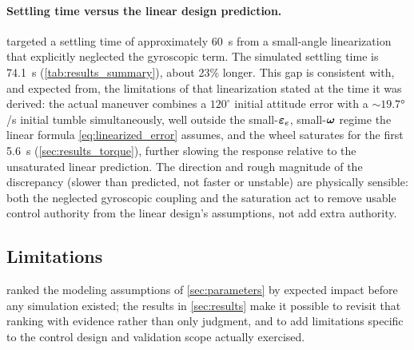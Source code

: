 \paragraph{Settling time versus the linear design prediction.}  targeted a settling time of approximately \SI{60}{\second} from a small-angle linearization that explicitly neglected the gyroscopic term. The simulated settling time is \SI{74.1}{\second} (\cref{tab:results_summary}), about 23\% longer. This gap is consistent with, and expected from, the limitations of that linearization stated at the time it was derived: the actual maneuver combines a $120^\circ$ initial attitude error with a $\sim\!\ang{19.7}$/s initial tumble simultaneously, well outside the small-$\bm{\varepsilon}_e$, small-$\bm{\omega}$ regime the linear formula \cref{eq:linearized_error} assumes, and the wheel saturates for the first \SI{5.6}{\second} (\cref{sec:results_torque}), further slowing the response relative to the unsaturated linear prediction. The direction and rough magnitude of the discrepancy (slower than predicted, not faster or unstable) are physically sensible: both the neglected gyroscopic coupling and the saturation act to remove usable control authority from the linear design's assumptions, not add extra authority.

\subsection{Limitations}
\label{sec:limitations}

 ranked the modeling assumptions of \cref{sec:parameters} by expected impact before any simulation existed; the results in \cref{sec:results} make it possible to revisit that ranking with evidence rather than only judgment, and to add limitations specific to the control design and validation scope actually exercised.

